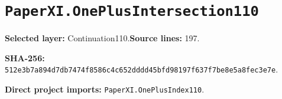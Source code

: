 \documentclass[10pt,oneside]{book}
\begin{document}
\section{\texorpdfstring{\nolinkurl{PaperXI.OnePlusIntersection110}}{PaperXI.OnePlusIntersection110}}\label{module:PaperXI.OnePlusIntersection110}

\textbf{Selected layer:} Continuation110.\quad\textbf{Source lines:} 197.\par\textbf{SHA-256:} {\scriptsize\nolinkurl{512e3b7a894d7db7474f8586c4c652dddd45bfd98197f637f7be8e5a8fec3e7e}}.


\textbf{Direct project imports:} \nolinkurl{PaperXI.OnePlusIndex110}.
\end{document}
